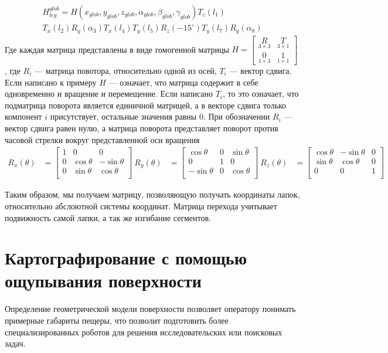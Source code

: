 \begin{multline}
        H_{leg}^{glob} = H(x_{glob},y_{glob},z_{glob},\alpha_{glob},\beta_{glob},\gamma_{glob})T_z(l_1)\\ T_x(l_2)R_y(\alpha_3)T_x(l_4)T_y(l_5)R_z(-15^{\circ})T_y(l_7)R_y(\alpha_8)
\end{multline}
Где каждая матрица представлены в виде гомогенной матрицы $H = \begin{bmatrix}
        \underset{3 \times 3}{R} & \underset{3 \times 1}{T} \\
        \underset{1 \times 3}{0} & \underset{1 \times 1}{1}
    \end{bmatrix}$, где $R_i$ --- матрица повотора, относительно одной из осей, $T_i$ --- вектор сдвига. Если написано к примеру $H$ --- означает, что матрица содержит в себе одновременно и вращение и перемещение. Если написано $T_i$, то это означает, что подматрица поворота является единичной матрицей, а в векторе сдвига только компонент $i$ присутствует, остальные значения равны $0$. При обозначении $R_i$ --- вектор сдвига равен нулю, а матрица поворота представляет поворот против часовой стрелки вокруг представленной оси вращения ${\displaystyle {\begin{alignedat}{1}R_{x}(\theta )&={\begin{bmatrix}1&0&0\\0&\cos \theta &-\sin \theta \\[3pt]0&\sin \theta &\cos \theta \\[3pt]\end{bmatrix}}\ R_{y}(\theta )&={\begin{bmatrix}\cos \theta &0&\sin \theta \\[3pt]0&1&0\\[3pt]-\sin \theta &0&\cos \theta \\\end{bmatrix}}\ R_{z}(\theta )&={\begin{bmatrix}\cos \theta &-\sin \theta &0\\[3pt]\sin \theta &\cos \theta &0\\[3pt]0&0&1\\\end{bmatrix}}\end{alignedat}}}$

    Таким образом, мы получаем матрицу, позволяющую получать координаты лапок, относительно абслоютной системы координат. Матрица перехода учитывает подвижность самой лапки, а так же изгибание сегментов.

\section{Картографирование с помощью ощупывания поверхности}
Определение геометрической модели поверхности позволяет оператору понимать примерные габариты пещеры, что позволит подготовить более специализированных роботов для решения исследовательских или поисковых задач.

